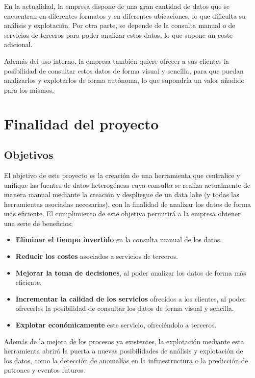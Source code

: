 En la actualidad, la empresa dispone de una gran cantidad de datos que se encuentran en
diferentes formatos y en diferentes ubicaciones, lo que dificulta su análisis y explotación.
Por otra parte, se depende de la consulta manual o de servicios de terceros para poder analizar
estos datos, lo que supone un coste adicional.

Además del uso interno, la empresa también quiere ofrecer a sus clientes la posibilidad de
consultar estos datos de forma visual y sencilla, para que puedan analizarlos y explotarlos de
forma autónoma, lo que supondría un valor añadido para los mismos.

\section{Finalidad del proyecto}\label{sec:finalidad}
\subsection{Objetivos}\label{subsec:objetivos}
El objetivo de este proyecto es la creación de una herramienta que centralice y unifique las
fuentes de datos heterogéneas cuya consulta se realiza actualmente de manera manual mediante
la creación y despliegue de un data lake (y todas las herramientas asociadas necesarias), con
la finalidad de analizar los datos de forma más eficiente. El cumplimiento de este objetivo
permitirá a la empresa obtener una serie de beneficios;

\begin{itemize}
	\item \textbf{Eliminar el tiempo invertido} en la consulta manual de los datos.
	\item \textbf{Reducir los costes} asociados a servicios de terceros.
	\item \textbf{Mejorar la toma de decisiones}, al poder analizar los datos de forma más eficiente.
	\item \textbf{Incrementar la calidad de los servicios} ofrecidos a los clientes, al poder ofrecerles
	    la posibilidad de consultar los datos de forma visual y sencilla.
	\item \textbf{Explotar económicamente} este servicio, ofreciéndolo a terceros.
\end{itemize}

Además de la mejora de los procesos ya existentes, la explotación mediante esta herramienta
abrirá la puerta a nuevas posibilidades de análisis y explotación de los datos, como la detección
de anomalías en la infraestructura o la predicción de patrones y eventos futuros.

